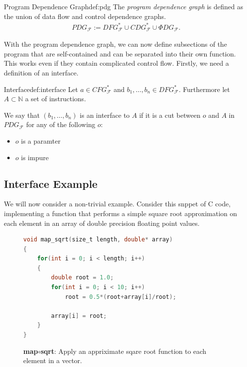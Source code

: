     \begin{definition}{Program Dependence Graph}{def:pdg}
        The {\em program dependence graph} is defined as the union of data flow
        and control dependence graphs.
        \begin{align*}
            PDG_\mathcal{F}:=DFG_\mathcal{F}^*\cup CDG_\mathcal{F}^*\cup\Phi DG_\mathcal{F}\text{.}
        \end{align*}
    \end{definition}

    With the program dependence graph, we can now define subsections of the
    program that are self-contained and can be separated into their own
    function.
    This works even if they contain complicated control flow.
    Firstly, we need a definition of an interface.

    \begin{definition}{Interface}{def:interface}
        Let $a\in CFG_\mathcal{F}^*$ and $b_1,\dots,b_n\in DFG_\mathcal{F}^*$.
        Furthermore let $A\subset\mathbb{N}$ a set of instructions.

        We say that $(b_1,\dots,b_n)$ is an interface to $A$ if it is a cut
        between $o$ and $A$ in $PDG_\mathcal{F}$ for any of the following $o$:
        \begin{itemize}
            \item $o$ is a paramter
            \item $o$ is impure
        \end{itemize}
    \end{definition}

\newpage
\subsection{Interface Example}

    We will now consider a non-trivial example.
    Consider this snppet of C code, implementing a function that performs a
    simple square root approximation on each element in an array of double
    precision floating point values.

\begin{figure}[ht]
\begin{lstlisting}[language=C]
void map_sqrt(size_t length, double* array)
{
    for(int i = 0; i < length; i++)
    {
        double root = 1.0;
        for(int i = 0; i < 10; i++)
            root = 0.5*(root+array[i]/root);

        array[i] = root;
    }
}
\end{lstlisting}
\caption{{\bf map$\circ$sqrt}: Apply an appriximate sqare root function to each
         element in a vector.}
\end{figure}


